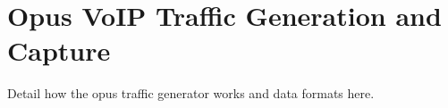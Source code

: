 \chapter{Opus VoIP Traffic Generation and Capture}
\label{adx:opus-traffic}

Detail how the opus traffic generator works and data formats here.

